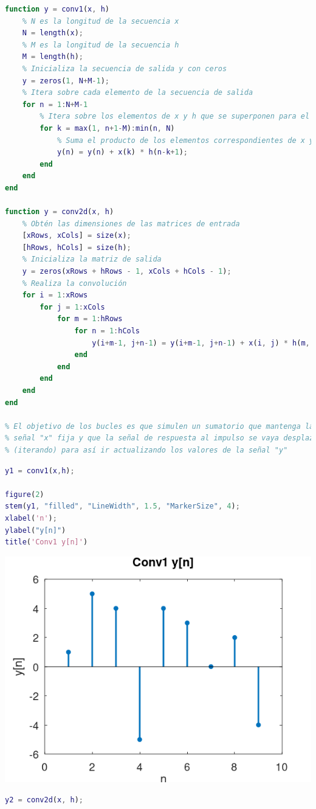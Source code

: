 \documentclass[12pt]{article}
\begin{document}
\begin{itemize}[leftmargin=*]
\begin{lstlisting}[language=matlab]
function y = conv1(x, h)
	% N es la longitud de la secuencia x
	N = length(x);
	% M es la longitud de la secuencia h
	M = length(h);
	% Inicializa la secuencia de salida y con ceros
	y = zeros(1, N+M-1);
	% Itera sobre cada elemento de la secuencia de salida
	for n = 1:N+M-1
		% Itera sobre los elementos de x y h que se superponen para el elemento actual de y
		for k = max(1, n+1-M):min(n, N)
			% Suma el producto de los elementos correspondientes de x y h a la secuencia de salida
			y(n) = y(n) + x(k) * h(n-k+1);
		end
	end
end

function y = conv2d(x, h)
	% Obtén las dimensiones de las matrices de entrada
	[xRows, xCols] = size(x);
	[hRows, hCols] = size(h);
	% Inicializa la matriz de salida
	y = zeros(xRows + hRows - 1, xCols + hCols - 1);
	% Realiza la convolución
	for i = 1:xRows
		for j = 1:xCols
			for m = 1:hRows
				for n = 1:hCols
					y(i+m-1, j+n-1) = y(i+m-1, j+n-1) + x(i, j) * h(m, n);
				end
			end
		end
	end
end

% El objetivo de los bucles es que simulen un sumatorio que mantenga la
% señal "x" fija y que la señal de respuesta al impulso se vaya desplazando
% (iterando) para así ir actualizando los valores de la señal "y"
\end{lstlisting}
	
	\begin{lstlisting}[language=matlab]
y1 = conv1(x,h);

figure(2)
stem(y1, "filled", "LineWidth", 1.5, "MarkerSize", 4);
xlabel('n');
ylabel("y[n]")
title('Conv1 y[n]')
	\end{lstlisting}
	\begin{center}
		\includegraphics[width=0.7\linewidth]{Imágenes/Figura2}
	\end{center}
\begin{lstlisting}[language=matlab]
y2 = conv2d(x, h);


\end{lstlisting}
\end{itemize}
\end{document}
